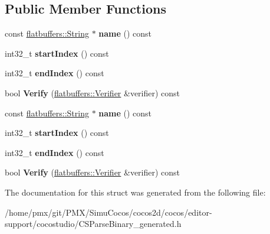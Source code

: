 \subsection*{Public Member Functions}
\begin{DoxyCompactItemize}
\item 
\mbox{\label{structflatbuffers_1_1AnimationInfo_a757d2c1faab05a945ffe0a5007a1fb1b}} 
const \hyperlink{structflatbuffers_1_1String}{flatbuffers\+::\+String} $\ast$ {\bfseries name} () const
\item 
\mbox{\label{structflatbuffers_1_1AnimationInfo_a205ceb2f6ce3a2baf7c2982bd8241fd1}} 
int32\+\_\+t {\bfseries start\+Index} () const
\item 
\mbox{\label{structflatbuffers_1_1AnimationInfo_a67fa47aeb858a3c89c9c27ac1778296f}} 
int32\+\_\+t {\bfseries end\+Index} () const
\item 
\mbox{\label{structflatbuffers_1_1AnimationInfo_a96240f1a204098294a1769d8d165e8de}} 
bool {\bfseries Verify} (\hyperlink{classflatbuffers_1_1Verifier}{flatbuffers\+::\+Verifier} \&verifier) const
\item 
\mbox{\label{structflatbuffers_1_1AnimationInfo_a757d2c1faab05a945ffe0a5007a1fb1b}} 
const \hyperlink{structflatbuffers_1_1String}{flatbuffers\+::\+String} $\ast$ {\bfseries name} () const
\item 
\mbox{\label{structflatbuffers_1_1AnimationInfo_a205ceb2f6ce3a2baf7c2982bd8241fd1}} 
int32\+\_\+t {\bfseries start\+Index} () const
\item 
\mbox{\label{structflatbuffers_1_1AnimationInfo_a67fa47aeb858a3c89c9c27ac1778296f}} 
int32\+\_\+t {\bfseries end\+Index} () const
\item 
\mbox{\label{structflatbuffers_1_1AnimationInfo_a96240f1a204098294a1769d8d165e8de}} 
bool {\bfseries Verify} (\hyperlink{classflatbuffers_1_1Verifier}{flatbuffers\+::\+Verifier} \&verifier) const
\end{DoxyCompactItemize}


The documentation for this struct was generated from the following file\+:\begin{DoxyCompactItemize}
\item 
/home/pmx/git/\+P\+M\+X/\+Simu\+Cocos/cocos2d/cocos/editor-\/support/cocostudio/C\+S\+Parse\+Binary\+\_\+generated.\+h\end{DoxyCompactItemize}
